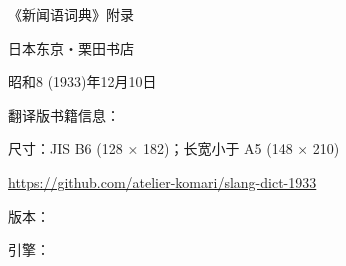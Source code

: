
\maketitle



《新闻语词典》附录

日本东京・栗田书店

昭和8 (1933)年12月10日

\vspace*{\fill}

翻译版书籍信息：

尺寸：JIS B6 (128 × 182)；长宽小于 A5 (148 × 210)

\url{https://github.com/atelier-komari/slang-dict-1933}

版本：\gitversion

引擎：\luatexbanner

\clearpage